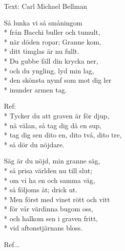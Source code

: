 \begin{SongText}
    \begin{SongInfo}
        Text: Carl Michael Bellman
    \end{SongInfo}
    \begin{SongVerse}
        Så lunka vi så småningom\\*%
        från Bacchi buller och tumult,\\*%
        när döden ropar; Granne kom,\\*%
        ditt timglas är nu fullt.\\*%
        Du gubbe fäll din krycka ner,\\*%
        och du yngling, lyd min lag,\\*%
        den skönsta nymf som mot dig ler\\*%
        inunder armen tag.
    \end{SongVerse}
    \begin{SongVerse}
        Ref:\\*%
        Tycker du att graven är för djup,\\*%
        nå välan, så tag dig då en sup,\\*%
        tag dig sen dito en, dito två, dito tre,\\*%
        så dör du nöjdare.
    \end{SongVerse}
    \begin{SongVerse}
        Säg är du nöjd, min granne säg,\\*%
        så prisa världen nu till slut;\\*%
        om vi ha en och samma väg,\\*%
        så följoms åt; drick ut.\\*%
        Men först med vinet rött och vitt\\*%
        för vår värdinna bugom oss,\\*%
        och halkom sen i graven fritt,\\*%
        vid aftonstjärnans bloss.
    \end{SongVerse}
    \begin{SongVerse}
        Ref...
    \end{SongVerse}
\end{SongText}
